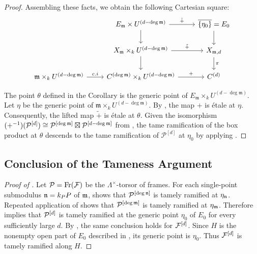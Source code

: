 \begin{proof}
Assembling these facts, we obtain the following Cartesian square:
\[
\begin{tikzcd}
&  E_{\mdls}\times U^{(d - \deg \mdls)}  \arrow[r, "\tilde{+}"] \arrow[d] & \overline{\{\eta_0 \}} =  E_0 \arrow[d] \\
& X_{\mdls} \times_k U^{(d - \deg \mdls)} \arrow[d] \arrow[r, "\tilde{+}"] & X_{\mdls, d} \arrow[d, "\pi"] \\
\mdls \times_k U^{(d-\deg \mdls)} \arrow[r, "c.i"] & C^{(\deg \mdls)} \times_k U^{(d-\deg \mdls)} \arrow[r, "+"]  & C^{(d)}          
\end{tikzcd}
\] 

The point $\theta$ defined in the Corollary is the generic point of $E_{\mathfrak{m}} \times_k U^{(d-\deg \mathfrak{m})}$.
 Let $\eta$ be the generic point of $\mathfrak{m} \times_k U^{(d-\deg \mathfrak{m})}$. 
 By , the map $+$ is étale at $\eta$. 
Consequently, the lifted map $\tilde{+}$ is étale at $\theta$. 
Given the isomorphism $(+^{-1})(\mathcal{P}^{[d]}) \cong \mathcal{P}^{[\deg \mathfrak{m}]} \boxtimes \mathcal{P}^{[d - \deg \mathfrak{m}]}$ from ,
the tame ramification of the box product at $\theta$ descends to the tame ramification of $\mathcal{P}^{[d]}$ at $\eta_0$ by applying .

\end{proof}


\subsection{Conclusion of the Tameness Argument}

\begin{proof}[Proof of ]
Let $\mathcal{P}=\operatorname{Fr}(\mathcal{F})$ be the $\Lambda^\times$-torsor of frames.
For each single-point submodulus $\mathfrak{n}=k_P P$ of $\mathfrak{m}$,
 shows that
$\mathcal{P}^{[\deg\mathfrak{n}]}$ is tamely ramified at $\eta_{\mathfrak{n}}$. Repeated application
of  shows that
$\mathcal{P}^{[\deg\mathfrak{m}]}$ is tamely ramified at $\eta_{\mathfrak{m}}$. Therefore
 implies that $\mathcal{P}^{[d]}$ is
tamely ramified at the generic point $\eta_0$ of $E_0$ for every
sufficiently large $d$. By
,
the same conclusion holds for $\mathcal{F}^{[d]}$. Since $H$ is the nonempty open
part of $E_0$ described in
, its generic point is
$\eta_0$. Thus $\mathcal{F}^{[d]}$ is tamely ramified along $H$.
\end{proof}

